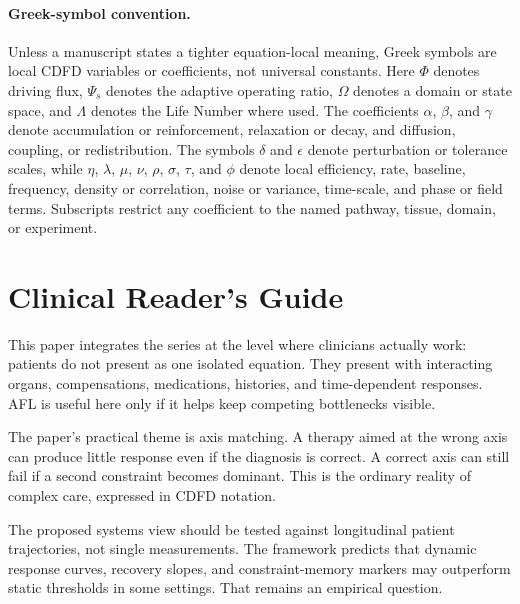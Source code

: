 \documentclass[11pt]{article}
\begin{document}
\paragraph{Greek-symbol convention.}
Unless a manuscript states a tighter equation-local meaning, Greek symbols are local CDFD variables or coefficients, not universal constants. Here $\Phi$ denotes driving flux, $\Psi_s$ denotes the adaptive operating ratio, $\Omega$ denotes a domain or state space, and $\Lambda$ denotes the Life Number where used. The coefficients $\alpha$, $\beta$, and $\gamma$ denote accumulation or reinforcement, relaxation or decay, and diffusion, coupling, or redistribution. The symbols $\delta$ and $\epsilon$ denote perturbation or tolerance scales, while $\eta$, $\lambda$, $\mu$, $\nu$, $\rho$, $\sigma$, $\tau$, and $\phi$ denote local efficiency, rate, baseline, frequency, density or correlation, noise or variance, time-scale, and phase or field terms. Subscripts restrict any coefficient to the named pathway, tissue, domain, or experiment.

\section*{Clinical Reader's Guide}
This paper integrates the series at the level where clinicians actually work: patients do not present as one isolated equation. They present with interacting organs, compensations, medications, histories, and time-dependent responses. AFL is useful here only if it helps keep competing bottlenecks visible.

The paper's practical theme is axis matching. A therapy aimed at the wrong axis can produce little response even if the diagnosis is correct. A correct axis can still fail if a second constraint becomes dominant. This is the ordinary reality of complex care, expressed in CDFD notation.

The proposed systems view should be tested against longitudinal patient trajectories, not single measurements. The framework predicts that dynamic response curves, recovery slopes, and constraint-memory markers may outperform static thresholds in some settings. That remains an empirical question.


\vspace{0.5em}\noindent{}
\vspace{0.75em}
\end{document}
